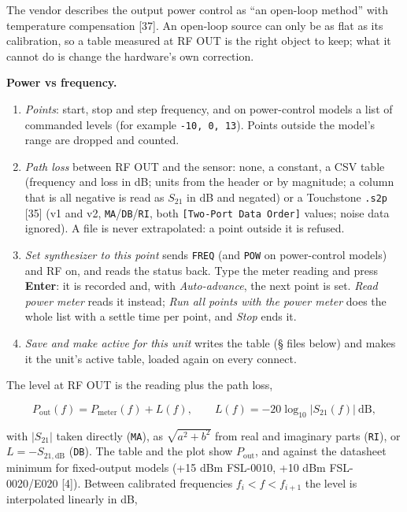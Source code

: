 \documentclass[
\directlua{luaotfload.add_fallback("qsfallback", {"DejaVu Sans:mode=harf;", "DejaVu Sans Mono:mode=harf;", "DejaVu Math TeX Gyre:mode=harf;"})}
  10pt,
  letterpaper,
]{article}
\providecommand{\tightlist}{%
  \setlength{\itemsep}{0pt}\setlength{\parskip}{0pt}}
\begin{document}
The vendor describes the output power control as ``an open-loop method''
with temperature compensation {[}37{]}. An open-loop source can only be
as flat as its calibration, so a table measured at RF OUT is the right
object to keep; what it cannot do is change the hardware's own
correction.

\textbf{Power vs frequency.}

\begin{enumerate}
\def\labelenumi{\arabic{enumi}.}
\tightlist
\item
  \emph{Points}: start, stop and step frequency, and on power-control
  models a list of commanded levels (for example \texttt{-10,\ 0,\ 13}).
  Points outside the model's range are dropped and counted.
\item
  \emph{Path loss} between RF OUT and the sensor: none, a constant, a
  CSV table (frequency and loss in dB; units from the header or by
  magnitude; a column that is all negative is read as \(S_{21}\) in dB
  and negated) or a Touchstone \texttt{.s2p} {[}35{]} (v1 and v2,
  \texttt{MA}/\texttt{DB}/\texttt{RI}, both
  \texttt{{[}Two-Port\ Data\ Order{]}} values; noise data ignored). A
  file is never extrapolated: a point outside it is refused.
\item
  \emph{Set synthesizer to this point} sends \texttt{FREQ} (and
  \texttt{POW} on power-control models) and RF on, and reads the status
  back. Type the meter reading and press \textbf{Enter}: it is recorded
  and, with \emph{Auto-advance}, the next point is set. \emph{Read power
  meter} reads it instead; \emph{Run all points with the power meter}
  does the whole list with a settle time per point, and \emph{Stop} ends
  it.
\item
  \emph{Save and make active for this unit} writes the table (§ files
  below) and makes it the unit's active table, loaded again on every
  connect.
\end{enumerate}

The level at RF OUT is the reading plus the path loss,

\[
P_\mathrm{out}(f) = P_\mathrm{meter}(f) + L(f), \qquad
L(f) = -20\log_{10}\lvert S_{21}(f)\rvert \ \text{dB},
\]

with \(\lvert S_{21}\rvert\) taken directly (\texttt{MA}), as
\(\sqrt{a^2+b^2}\) from real and imaginary parts (\texttt{RI}), or
\(L = -S_{21,\mathrm{dB}}\) (\texttt{DB}). The table and the plot show
\(P_\mathrm{out}\), and against the datasheet minimum for fixed-output
models (+15 dBm FSL-0010, +10 dBm FSL-0020/E020 {[}4{]}). Between
calibrated frequencies \(f_i < f < f_{i+1}\) the level is interpolated
linearly in dB,
\end{document}
